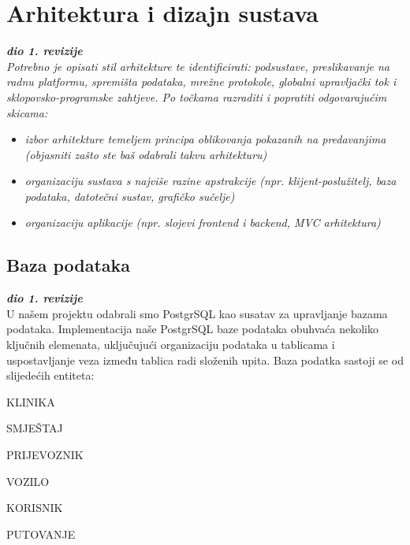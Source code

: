 \chapter{Arhitektura i dizajn sustava}
		
		\textbf{\textit{dio 1. revizije}}\\

		\textit{ Potrebno je opisati stil arhitekture te identificirati: podsustave, preslikavanje na radnu platformu, spremišta podataka, mrežne protokole, globalni upravljački tok i sklopovsko-programske zahtjeve. Po točkama razraditi i popratiti odgovarajućim skicama:}
	\begin{itemize}
		\item 	\textit{izbor arhitekture temeljem principa oblikovanja pokazanih na predavanjima (objasniti zašto ste baš odabrali takvu arhitekturu)}
		\item 	\textit{organizaciju sustava s najviše razine apstrakcije (npr. klijent-poslužitelj, baza podataka, datotečni sustav, grafičko sučelje)}
		\item 	\textit{organizaciju aplikacije (npr. slojevi frontend i backend, MVC arhitektura) }		
	\end{itemize}

	
		

		

				
		\section{Baza podataka}
			
			\textbf{\textit{dio 1. revizije}}\\
			
		U našem projektu odabrali smo PostgrSQL kao susatav za upravljanje bazama podataka. Implementacija naše PostgrSQL baze podataka obuhvaća nekoliko ključnih elemenata, uključujući organizaciju podataka u tablicama i uspostavljanje veza između tablica radi složenih upita. Baza podatka sastoji se od slijedećih entiteta: 
		
		\begin{packed_item}
			\item KLINIKA
			\item SMJEŠTAJ
			\item PRIJEVOZNIK
			\item VOZILO
			\item KORISNIK
			\item PUTOVANJE
		\end{packed_item}
		
